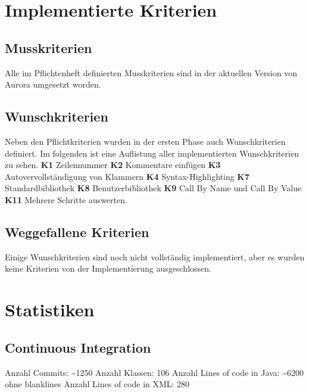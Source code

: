 \documentclass[parskip=full,11pt,twoside]{scrartcl}
\begin{document}
\newpage


\section{Implementierte Kriterien}

\subsection{Musskriterien}
Alle im Pflichtenheft definierten Musskriterien sind in der aktuellen Version von Aurora umgesetzt worden.

\subsection{Wunschkriterien}
Neben den Pflichtkriterien wurden in der ersten Phase auch Wunschkriterien definiert.
Im folgenden ist eine Auflistung aller implementierten Wunschkriterien zu sehen.
\newline
\newline
\textbf{K1} Zeilennummer
\newline
\textbf{K2} Kommentare einfügen
\newline
\textbf{K3} Autovervollständigung von Klammern
\newline
\textbf{K4} Syntax-Highlighting
\newline
\textbf{K7} Standardbibliothek
\newline
\textbf{K8} Benutzerbibliothek
\newline
\textbf{K9} Call By Name und Call By Value
\newline
\textbf{K11} Mehrere Schritte auswerten.
\newline

\subsection{Weggefallene Kriterien}
Einige Wunschkriterien sind noch nicht vollständig implementiert, aber es wurden keine Kriterien von der Implementierung ausgeschlossen.
\newpage


\section{Statistiken}

\subsection{Continuous Integration}
Anzahl Commits: \textasciitilde  1250\newline
Anzahl Klassen: 106
Anzahl Lines of code in Java: \textasciitilde 6200 ohne blanklines
Anzahl Lines of code in XML: 280
\end{document}
